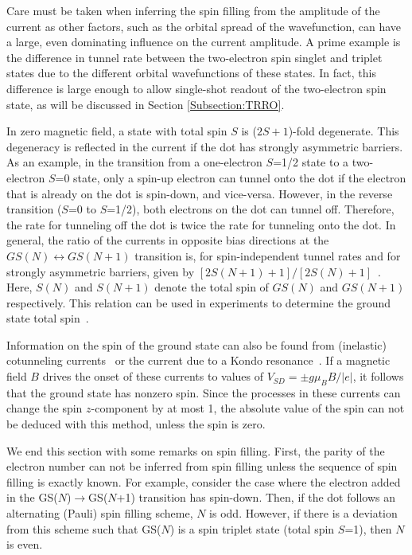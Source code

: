 \documentclass[12pt,aps,nofootinbib]{revtex4-1}
\begin{document}
Care must be taken when inferring the spin filling from the amplitude of the current as other factors, such as the orbital spread of the wavefunction, can have a large, even dominating influence on the current amplitude. A prime example is the difference in tunnel rate between the two-electron spin singlet and triplet states due to the different orbital wavefunctions of these states. In fact, this difference is large enough to allow single-shot readout of the two-electron spin state, as will be discussed in Section \ref{Subsection:TRRO}.

In zero magnetic field, a state with total spin $S$ is
($2S+1$)-fold degenerate. This degeneracy is reflected in the
current if the dot has strongly asymmetric barriers. As an example, in the transition from a one-electron $S$=1/2 state to a two-electron $S$=0 state, only a spin-up electron can tunnel onto the dot if the electron that is already on the dot is spin-down, and vice-versa. However, in the reverse transition ($S$=0 to $S$=1/2), both electrons on the dot can tunnel off. Therefore, the rate for tunneling off the dot is twice the rate for tunneling onto the dot. In general, the ratio of the currents in opposite bias directions at the $GS(N)\leftrightarrow GS(N\!+\!1)$ transition is, for spin-independent tunnel rates and for strongly asymmetric barriers, given by $[2S(N\!+\!1)+1]/[2S(N)+1]$~\cite{Akera99}. Here, $S(N)$ and $S(N\!+\!1)$ denote the total spin of $GS(N)$ and $GS(N\!+\!1)$ respectively. This
relation can be used in experiments to determine the ground state
total spin~\cite{Cobden98,Hayashi03}.

Information on the spin of the ground state can also be found from
(inelastic) cotunneling currents~\cite{KoganPRL2004} or the
current due to a Kondo resonance~\cite{Goldhaber98, Cronenwett98}. If a magnetic
field $B$ drives the onset of these currents to values of
$V_{SD}=\pm g \mu_B B/\left|e\right|$, it follows that the ground
state has nonzero spin. Since the processes in
these currents can change the spin $z$-component by at most 1, the
absolute value of the spin can not be deduced with this method,
unless the spin is zero.

We end this section with some remarks on spin filling. First, the
parity of the electron number can not be inferred from spin
filling unless the sequence of spin filling is exactly known. For
example, consider the case where the electron added in the
GS($N$)$\rightarrow$GS($N$+1) transition has spin-down. Then, if
the dot follows an alternating (Pauli) spin filling scheme, $N$ is
odd. However, if there is a deviation from this scheme such that
GS($N$) is a spin triplet state (total spin $S$=1), then $N$ is
even.
\end{document}
